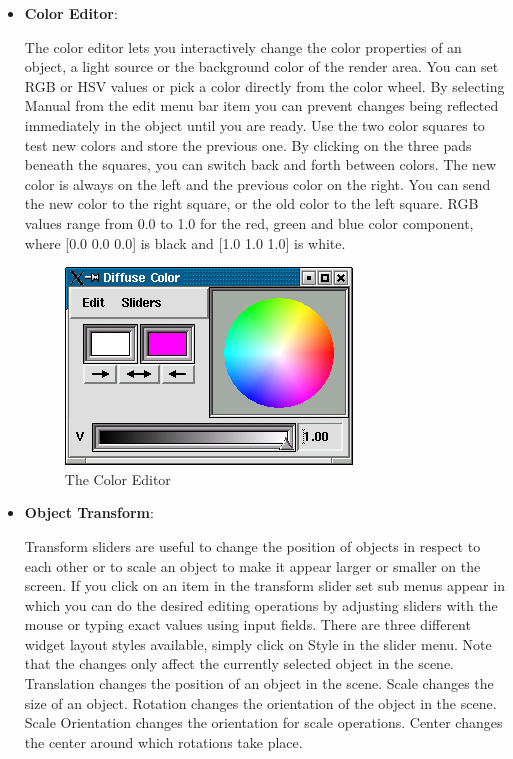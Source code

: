 \begin{itemize}
\item {\bf Color Editor}:

The color editor lets you interactively change the color properties of an
object, a light source or the background color of the render area. You can
set RGB or HSV values or pick a color directly from the color wheel. By
selecting Manual from the edit menu bar item you can prevent changes being
reflected immediately in the object until you are ready. Use the two color
squares to test new colors and store the previous one. By clicking on the
three pads beneath the squares, you can switch back and forth between colors.
The new color is always on the left and the previous color on the right.
You can send the new color to the right square, or the old color to the
left square. RGB values range from 0.0 to 1.0 for the red, green and blue
color component, where [0.0 0.0 0.0] is black and [1.0 1.0 1.0] is white.

 \latexonly
 \begin{figure}[htp]
  \begin{center}
   \includegraphics[scale=0.7]{renderer/pict/image17}
   \caption{The Color Editor}
	\label{fig63a}
  \end{center}
 \end{figure}
 \endlatexonly

\item {\bf Object Transform}:

Transform sliders are useful to change the position of objects in respect
to each other or to scale an object to make it appear larger or smaller on
the screen. If you click on an item in the transform slider set sub menus
appear in which you can do the desired editing operations by adjusting
sliders with the mouse or typing exact values using input fields. There
are three different widget layout styles available, simply click on Style
in the slider menu. Note that the changes only affect the currently
selected object in the scene. Translation changes the position of an
object in the scene. Scale changes the size of an object. Rotation
changes the orientation of the object in the scene. Scale Orientation
changes the orientation for scale operations. Center changes the center
around which rotations take place.


\end{itemize}

